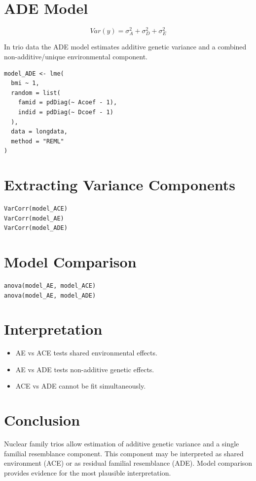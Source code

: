 \documentclass[12pt]{article}
\begin{document}
\section{ADE Model}

\[
Var(y) = \sigma_A^2 + \sigma_D^2 + \sigma_E^2
\]

In trio data the ADE model estimates additive genetic variance and a
combined non-additive/unique environmental component.

\begin{verbatim}
model_ADE <- lme(
  bmi ~ 1,
  random = list(
    famid = pdDiag(~ Acoef - 1),
    indid = pdDiag(~ Dcoef - 1)
  ),
  data = longdata,
  method = "REML"
)
\end{verbatim}

\section{Extracting Variance Components}

\begin{verbatim}
VarCorr(model_ACE)
VarCorr(model_AE)
VarCorr(model_ADE)
\end{verbatim}

\section{Model Comparison}

\begin{verbatim}
anova(model_AE, model_ACE)
anova(model_AE, model_ADE)
\end{verbatim}

\section{Interpretation}

\begin{itemize}
\item AE vs ACE tests shared environmental effects.
\item AE vs ADE tests non-additive genetic effects.
\item ACE vs ADE cannot be fit simultaneously.
\end{itemize}

\section{Conclusion}

Nuclear family trios allow estimation of additive genetic variance and a
single familial resemblance component. This component may be interpreted
as shared environment (ACE) or as residual familial resemblance (ADE).
Model comparison provides evidence for the most plausible interpretation.
\end{document}
